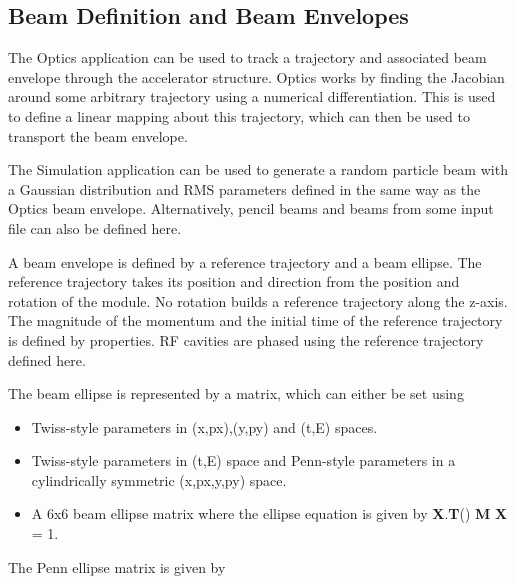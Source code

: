 \subsection{Beam Definition and Beam Envelopes}
The Optics application can be used to track a trajectory and associated beam envelope through the accelerator structure.
Optics works by finding the Jacobian around some arbitrary trajectory using a numerical differentiation. This is used
to define a linear mapping about this trajectory, which can then be used to transport the beam envelope.

The Simulation application can be used to generate a random particle beam with a Gaussian distribution and RMS
parameters defined in the same way as the Optics beam envelope. Alternatively, pencil beams and beams from some input
file can also be defined here.

A beam envelope is defined by a reference trajectory and a beam ellipse. The reference trajectory takes its position and
direction from the position and rotation of the module. No rotation builds a reference trajectory along the z-axis. The
magnitude of the momentum and the initial time of the reference trajectory is defined by properties. RF cavities are
phased using the reference trajectory defined here.

The beam ellipse is represented by a matrix, which can either be set using 

\liststyleLxii
\begin{itemize}
\item Twiss-style parameters in (x,px),(y,py) and (t,E) spaces.
\item Twiss-style parameters in (t,E) space and Penn-style parameters in a cylindrically symmetric (x,px,y,py) space.
\item A 6x6 beam ellipse matrix where the ellipse equation is given by \textbf{X}.\textbf{T}() \textbf{M} \textbf{X} =
1.
\end{itemize}
The Penn ellipse matrix is given by

